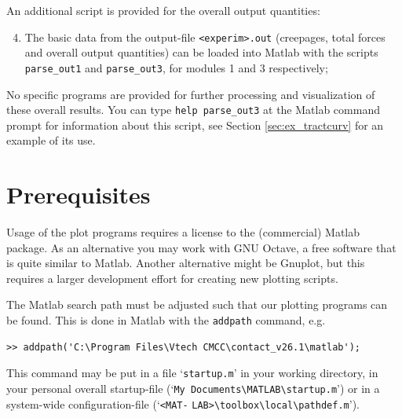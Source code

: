 \documentclass[12pt]{report}
\begin{document}
An additional script is provided for the overall output quantities:
\begin{enumerate}\setcounter{enumi}{3}
\item The basic data from the output-file {\tt <experim>.out} (creepages,
        total forces and overall output quantities) can be loaded into
        Matlab with the scripts {\tt parse\_out1} and {\tt parse\_out3},
        for modules 1 and 3 respectively;
\end{enumerate}
No specific programs are provided for further processing and visualization
of these overall results. You can type {\tt help parse\_out3} at the Matlab
command prompt for information about this script, see Section
\ref{sec:ex_tractcurv} for an example of its use.

\section{Prerequisites}

Usage of the plot programs requires a license to the (commercial) Matlab
package. As an alternative you may work with GNU Octave, a free software
that is quite similar to Matlab. Another alternative might be Gnuplot, but
this requires a larger development effort for creating new plotting
scripts.

The Matlab search path must be adjusted such that our plotting programs can
be found. This is done in Matlab with the {\tt addpath} command, e.g.
\begin{verbatim}
>> addpath('C:\Program Files\Vtech CMCC\contact_v26.1\matlab');
\end{verbatim}
This command may be put in a file `{\tt startup.m}' in your working
directory, in your personal overall startup-file
(`\verb+My Documents\MATLAB\startup.m+') or in a system-wide
configuration-file (`\verb+<MAT-+ \verb+LAB>\toolbox\local\pathdef.m+').
\end{document}
